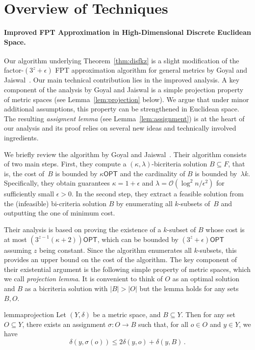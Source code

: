 \documentclass[11pt]{article}
\newcommand{\opt}{\ensuremath{\textsf{OPT}}}
\newcommand{\fpt}{\textsf{FPT}\xspace}
\newcommand{\bigO}[1]{\ensuremath{\mathcal{O}\left(#1\right)}}
\begin{document}
\section{Overview of Techniques} 
\label{sec:overview}


\paragraph*{Improved \fpt Approximation in High-Dimensional Discrete Euclidean Space.}
Our algorithm underlying Theorem~\ref{thm:disfkz} is a slight modification of the factor-$(3^z+\epsilon)$ \fpt approximation algorithm for general metrics by Goyal and Jaiswal~\cite{goyal2021tight}. Our main technical contribution lies in the improved analysis. A key component of the analysis by Goyal and Jaiswal is a simple projection property of metric spaces (see Lemma~\ref{lem:projection} below). We argue that under minor additional assumptions, this property can be strengthened in Euclidean space. The resulting \emph{assigment lemma} (see Lemma~\ref{lem:assignment}) is at the heart of our analysis and its proof relies on several new ideas and technically involved ingredients.

We briefly review the algorithm by Goyal and Jaiswal~\cite{goyal2021tight}. Their algorithm consists of two main steps. First, they compute a $(\kappa,\lambda)$-bicriteria solution $B\subseteq F$, that is, the cost of~$B$ is bounded by $\kappa\opt$ and the cardinality of $B$ is bounded by~$\lambda k$. Specifically, they obtain guarantees $\kappa=1+\epsilon$ and $\lambda=\bigO{\log^2n/\epsilon^2}$ for sufficiently small $\epsilon>0$. In the second step, they extract a feasible solution from the (infeasible) bi-criteria solution $B$ by enumerating all $k$-subsets of~$B$ and outputting the one of minimum cost.

Their analysis is based on proving the existence of a $k$-subset of $B$ whose cost is at most ${(3^{z-1}(\kappa+2))\opt}$, which can be bounded by $(3^z+\epsilon)\opt$ assuming $z$ being constant. Since the algorithm enumerates all $k$-subsets, this provides an upper bound on the cost of the algorithm. The key component of their existential argument is the following simple property of metric spaces, which we call \emph{projection lemma}. It is convenient to think of $O$ as an optimal solution and $B$ as a bicriteria solution with $|B|>|O|$ but the lemma holds for any sets $B,O$.
\begin{restatable}{lemma}{projection}
\label{lem:projection}
Let $(Y,\delta)$ be a metric space, and $B \subseteq Y$. Then for any set $O \subseteq Y$, there exists an assignment $\sigma\colon O \rightarrow B$ such that, for all $o \in O$ and $y \in Y$, we have 
\begin{equation}\label{eq:projection-lemma}
    \delta(y, \sigma(o)) \leq 2\delta(y, o)+ \delta(y,B)\,.
\end{equation} 
\end{restatable}
\end{document}
